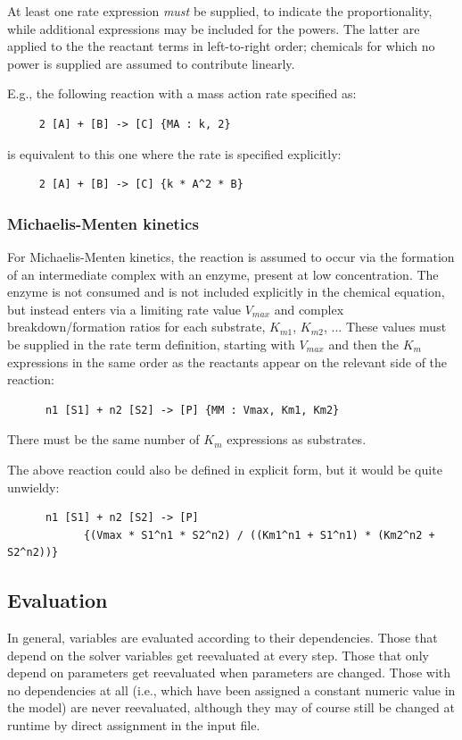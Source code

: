 \documentclass[a4paper,11pt]{article}
\begin{document}
At least one rate expression \textit{must} be supplied, to indicate the proportionality, while additional expressions may be included for the powers. The latter are applied to the the reactant terms in left-to-right order; chemicals for which no power is supplied are assumed to contribute linearly.

E.g., the following reaction with a mass action rate specified as:
\begin{verbatim}
     2 [A] + [B] -> [C] {MA : k, 2}
\end{verbatim}
is equivalent to this one where the rate is specified explicitly:
\begin{verbatim}
     2 [A] + [B] -> [C] {k * A^2 * B}
\end{verbatim}

\subsubsection{Michaelis-Menten kinetics}\label{mmk}

For Michaelis-Menten kinetics, the reaction is assumed to occur via the formation of an intermediate complex with an enzyme, present at low concentration. The enzyme is not consumed and is not included explicitly in the chemical equation, but instead enters via a limiting rate value $V_{max}$ and complex breakdown/formation ratios for each substrate, $K_{m1}$, $K_{m2}$, ... These values must be supplied in the rate term definition, starting with $V_{max}$ and then the $K_{m}$ expressions in the same order as the reactants appear on the relevant side of the reaction:
\begin{verbatim}
      n1 [S1] + n2 [S2] -> [P] {MM : Vmax, Km1, Km2}
\end{verbatim}
There must be the same number of $K_m$ expressions as substrates.

The above reaction could also be defined in explicit form, but it would be quite unwieldy:
\begin{verbatim}
      n1 [S1] + n2 [S2] -> [P]
            {(Vmax * S1^n1 * S2^n2) / ((Km1^n1 + S1^n1) * (Km2^n2 + S2^n2))}
\end{verbatim}


\subsection{Evaluation}\label{eval}

In general, variables are evaluated according to their dependencies. Those that depend on the solver variables get reevaluated at every step. Those that only depend on parameters get reevaluated when parameters are changed. Those with no dependencies at all (i.e., which have been assigned a constant numeric value in the model) are never reevaluated, although they may of course still be changed at runtime by direct assignment in the input file.
\end{document}
